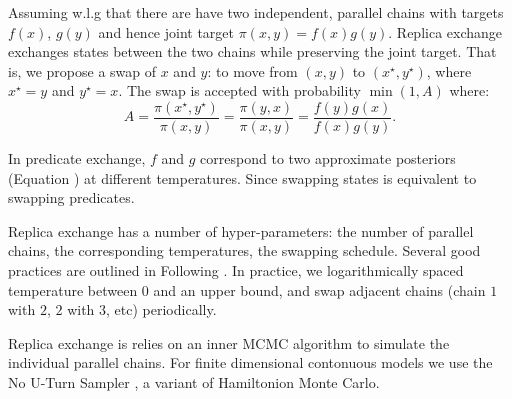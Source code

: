 Assuming w.l.g that there are have two independent, parallel chains with targets $f(x)$, $g(y)$ and hence joint target $\pi(x,y)=f(x)g(y)$.
Replica exchange exchanges states between the two chains while preserving the joint target.
That is, we propose a swap of $x$ and $y$: to move from $(x, y)$ to $(x^\star,y^\star)$, where $x^\star=y$ and $y^\star=x$.
The swap is accepted with probability $\min(1, A)$ where:
$$
A = \frac{\pi(x^\star,y^\star)}{\pi(x,y)} = \frac{\pi(y,x)}{\pi(x,y)} = \frac{f(y)g(x)}{f(x)g(y)}.
$$

In predicate exchange, $f$ and $g$ correspond to two approximate posteriors (Equation ) at different temperatures.
Since swapping states is equivalent to swapping predicates.

Replica exchange has a number of hyper-parameters: the number of parallel chains, the corresponding temperatures, the swapping schedule.
Several good practices are outlined in Following \cite{earl2005parallel}.  In practice, we logarithmically spaced temperature between $0$ and an upper bound, and swap adjacent chains (chain $1$ with $2$, $2$ with $3$, etc) periodically.

Replica exchange is relies on an inner MCMC algorithm to simulate the individual parallel chains.
For finite dimensional contonuous models we use the No U-Turn Sampler \cite{hoffman2014no}, a variant of Hamiltonion Monte Carlo.





